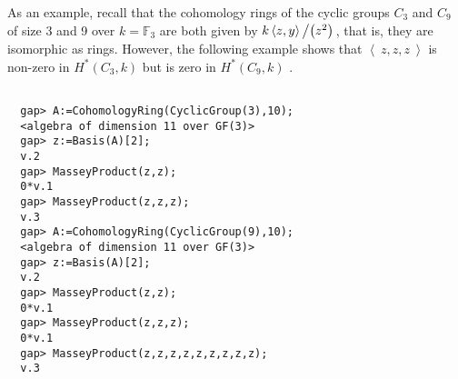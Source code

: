\documentclass[11pt]{report}
\begin{document}
{{ As an example, recall that the cohomology rings of the cyclic groups $C_3$ and $C_9$ of size 3 and 9 over $k=\mathbb{F}_3$  are both given by  $k\left\langle z, y\right\rangle\left/\left(z^2\right)\right.$,  that is, they are isomorphic as rings. However, the following example shows
that $\left\langle~z, z, z~\right\rangle$ is non-zero in $H^\ast\left(C_3,k\right)$  but is zero in $H^\ast\left(C_9,k\right)$ . 
\begin{Verbatim}[fontsize=\small,frame=single,label=Example]
  
  gap> A:=CohomologyRing(CyclicGroup(3),10);
  <algebra of dimension 11 over GF(3)>
  gap> z:=Basis(A)[2];
  v.2
  gap> MasseyProduct(z,z);
  0*v.1
  gap> MasseyProduct(z,z,z);
  v.3
  gap> A:=CohomologyRing(CyclicGroup(9),10);
  <algebra of dimension 11 over GF(3)>
  gap> z:=Basis(A)[2];
  v.2
  gap> MasseyProduct(z,z);
  0*v.1
  gap> MasseyProduct(z,z,z);
  0*v.1
  gap> MasseyProduct(z,z,z,z,z,z,z,z,z);
  v.3
  
\end{Verbatim}
 }

 }

 
\end{document}
